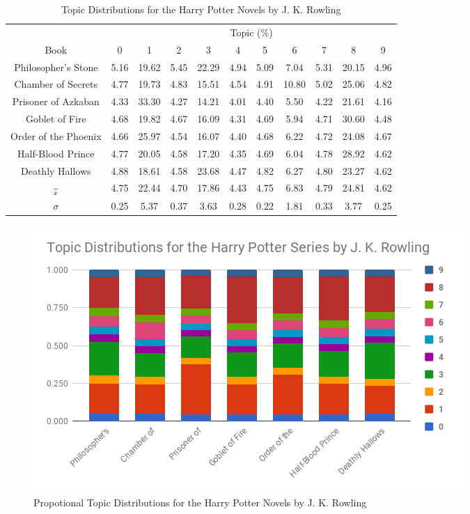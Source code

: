 \documentclass[10pt]{report}
\begin{document}
\renewcommand{\baselinestretch}{1.0}\normalsize
\renewcommand{\arraystretch}{1.2}
\begin{table}[h!]
  \centering
  \begin{tabular}{c || c | c | c | c | c | c | c | c | c | c }
    &     \multicolumn{10}{c}{Topic (\%)}\\
    Book                 & 0     & 1    & 2     & 3      & 4    & 5     & 6    & 7     & 8     & 9 \\
    \hline
Philosopher's Stone	&5.16&	19.62&	5.45&	22.29&	4.94&	5.09&	7.04&	5.31&	20.15&	4.96\\
Chamber of Secrets	&4.77&	19.73&	4.83&	15.51&	4.54&	4.91&	10.80&	5.02&	25.06&	4.82\\
Prisoner of Azkaban	&4.33&	33.30&	4.27&	14.21&	4.01&	4.40&	5.50&	4.22&	21.61&	4.16\\
Goblet of Fire	        &4.68&	19.82&	4.67&	16.09&	4.31&	4.69&	5.94&	4.71&	30.60&	4.48\\
Order of the Phoenix    &4.66&	25.97&	4.54&	16.07&	4.40&	4.68&	6.22&	4.72&	24.08&	4.67\\
Half-Blood Prince	&4.77&	20.05&	4.58&	17.20&	4.35&	4.69&	6.04&	4.78&	28.92&	4.62\\
    Deathly Hallows	&4.88&	18.61&	4.58&	23.68&	4.47&	4.82&	6.27&	4.80&	23.27&	4.62\\
    \hline
    $\over{x}$          &4.75&	22.44&	4.70&	17.86&	4.43&	4.75&	6.83&	4.79&	24.81&	4.62\\
    $\sigma$            &0.25&	5.37&	0.37&	3.63&	0.28&	0.22&	1.81&	0.33&	3.77&	0.25
  \end{tabular}
  \caption{Topic Distributions for the Harry Potter Novels by J. K. Rowling \label{tab:hp_topics}}
\end{table}
\renewcommand{\baselinestretch}{2.0}\normalsize
\renewcommand{\arraystretch}{1.0}

\begin{figure}[h!]
  \includegraphics[scale=0.65]{hp_topics}
  \caption{Propotional Topic Distributions for the Harry Potter Novels by J. K. Rowling \label{fig:hp_topics}}
\end{figure}
\end{document}
